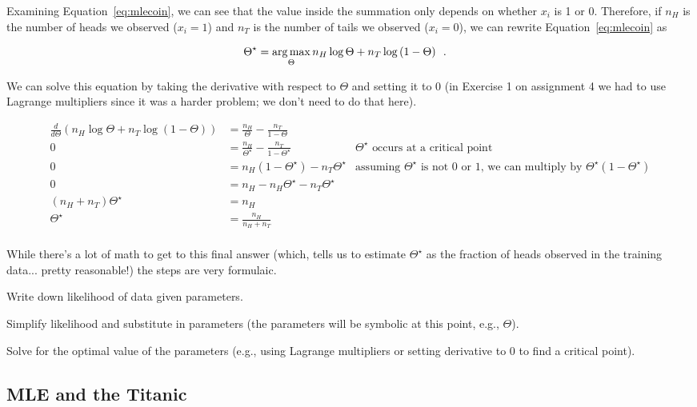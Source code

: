 \documentclass{tufte-handout}
\begin{document}
Examining Equation~\ref{eq:mlecoin}, we can see that the value inside the summation only depends on whether $x_i$ is 1 or 0.  Therefore, if $n_{H}$ is the number of heads we observed ($x_i = 1$) and $n_{T}$ is the number of tails we observed ($x_i = 0$), we can rewrite Equation~\ref{eq:mlecoin} as


\begin{align}
\Theta^\star &= \operatorname*{arg\,max}_{\Theta} n_H \log \Theta  + n_T  \log\left (1-  \Theta \right) \label{eq:mlecoincount} \enspace .
\end{align}

We can solve this equation by taking the derivative with respect to $\Theta$ and setting it to 0 (in Exercise 1 on assignment 4 we had to use Lagrange multipliers since it was a harder problem; we don't need to do that here).

\begin{align}
\frac{d}{d\Theta} \left ( n_H \log \Theta  + n_T  \log\left (1-  \Theta \right) \right) &=  \frac{n_H}{\Theta} - \frac{n_T}{1-\Theta} \nonumber \\
0 &= \frac{n_H}{\Theta^\star} - \frac{n_T}{1-\Theta^\star} \nonumber & \mbox{$\Theta^\star$ occurs at a critical point}\\
0 &=  n_H(1-\Theta^\star) - n_T \Theta^\star &\mbox{assuming $\Theta^\star$ is not 0 or 1, we can multiply by $\Theta^\star(1-\Theta^\star)$} \nonumber \\
0&= n_H - n_H \Theta^\star -  n_T \Theta^\star \nonumber \\
(n_H + n_T) \Theta^\star &= n_H \nonumber \\
\Theta^\star &= \frac{n_H}{n_H + n_T} \nonumber \\
\end{align}

While there's a lot of math to get to this final answer (which, tells us to estimate $\Theta^\star$ as the fraction of heads observed in the training data... pretty reasonable!) the steps are very formulaic.
\be
\item Write down likelihood of data given parameters.
\item Simplify likelihood and substitute in parameters (the parameters will be symbolic at this point, e.g., $\Theta$).
\item Solve for the optimal value of the parameters (e.g., using Lagrange multipliers or setting derivative to 0 to find a critical point).
\ee

\subsection{MLE and the Titanic}
\end{document}

